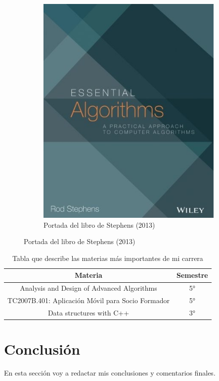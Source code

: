 \documentclass{article}
\begin{document}
\begin{figure}[H]
\begin{subfigure}[b]{0.45\textwidth}
        \includegraphics[scale=0.385, angle=0]{stephens.jpg}
        \caption{Portada del libro de Stephens (2013)}\label{fig:stephens2013}
    \end{subfigure}
\end{figure}

\begin{table}[H]
    \centering
    \begin{tabular}{|c|c|} %
        \hline %
        \textbf{Materia} & \textbf{Semestre} \\
        \hline %
        Analysis and Design of Advanced Algorithms & 5°  \\
        \hline %
        TC2007B.401: Aplicación Móvil para Socio Formador & 5° \\
        \hline %
        Data structures with C++ & 3° \\
        \hline %
    \end{tabular}
    \caption{Tabla que describe las materias más importantes de mi carrera}\label{tab:tabla1}
\end{table}

\section{Conclusión}
En esta sección voy a redactar mis conclusiones y comentarios finales.
\end{document}
